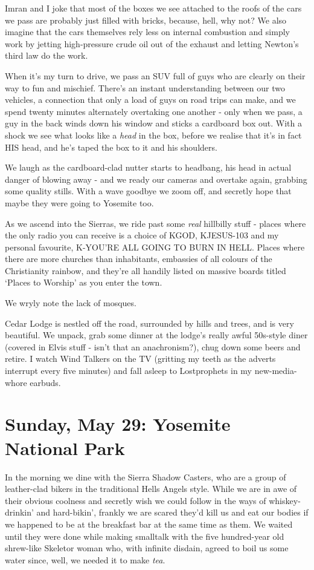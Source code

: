 \documentclass[a5paper,titlepage,11pt]{book}
\begin{document}
Imran and I joke that most of the boxes we see attached to the roofs of the cars we pass are probably just filled with bricks, because, hell, why not?  We also imagine that the cars themselves rely less on internal combustion and simply work by jetting high-pressure crude oil out of the exhaust and letting Newton's third law do the work.

When it's my turn to drive, we pass an SUV full of guys who are clearly on their way to fun and mischief. There's an instant understanding between our two vehicles, a connection that only a load of guys on road trips can make, and we spend twenty minutes alternately overtaking one another - only when we pass, a guy in the back winds down his window and sticks a cardboard box out. With a shock we see what looks like a \emph{head} in the box, before we realise that it's in fact HIS head, and he's taped the box to it and his shoulders.

We laugh as the cardboard-clad nutter starts to headbang, his head in actual danger of blowing away - and we ready our cameras and overtake again, grabbing some quality stills. With a wave goodbye we zoom off, and secretly hope that maybe they were going to Yosemite too.

As we ascend into the Sierras, we ride past some \emph{real} hillbilly stuff - places where the only radio you can receive is a choice of KGOD, KJESUS-103 and my personal favourite, K-YOU'RE ALL GOING TO BURN IN HELL. Places where there are more churches than inhabitants, embassies of all colours of the Christianity rainbow, and they're all handily listed on massive boards titled `Places to Worship' as you enter the town.

We wryly note the lack of mosques.

Cedar Lodge is nestled off the road, surrounded by hills and trees, and is very beautiful. We unpack, grab some dinner at the lodge's really awful 50s-style diner (covered in Elvis stuff - isn't that an anachronism?), chug down some beers and retire. I watch Wind Talkers on the TV (gritting my teeth as the adverts interrupt every five minutes) and fall asleep to Lostprophets in my new-media-whore earbuds.

\chapter[Yosemite National Park]{Sunday, May 29: Yosemite National Park}
In the morning we dine with the Sierra Shadow Casters, who are a group of leather-clad bikers in the traditional Hells Angels style. While we are in awe of their obvious coolness and secretly wish we could follow in the ways of whiskey-drinkin' and hard-bikin', frankly we are scared they'd kill us and eat our bodies if we happened to be at the breakfast bar at the same time as them. We waited until they were done while making smalltalk with the five hundred-year old shrew-like Skeletor woman who, with infinite disdain, agreed to boil us some water since, well, we needed it to make \emph{tea}.
\end{document}
